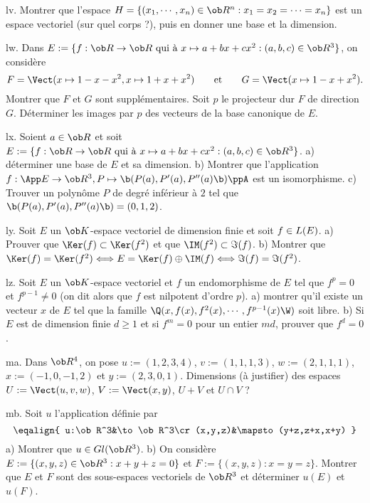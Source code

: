 \exo  [Level=1,Fight=0,Learn=0,Field=\DimensionFinie,Type=\Exercices,Origin=] lv. 
Montrer que l'espace $H=\{(x_1,\cdots,x_n)\in\ob R^n:x_1=x_2=\cdots=x_n\}$ est un espace vectoriel (sur quel corps ?), puis en donner une base et la dimension. 

\exo  [Level=1,Fight=0,Learn=1,Field=\DimensionFinie,Type=\Exercices,Origin=] lw. 
Dans $E:=\{f:\ob R\to\ob R\hbox{ qui à }x\mapsto a+bx+cx^2:(a,b,c)\in\ob R^3\}$, on considère
$$
F=\Vect(x\mapsto 1-x-x^2,x\mapsto 1+x+x^2)\qquad\hbox{et}\qquad G=\Vect(x\mapsto 1-x+x^2).
$$
Montrer que $F$ et $G$ sont supplémentaires. Soit $p$ le projecteur dur $F$ de direction $G$. Déterminer les images par $p$ des vecteurs de la base canonique de $E$. 

\exo  [Level=1,Fight=0,Learn=1,Field=\DimensionFinie,Type=\Exercices,Origin=] lx. 
Soient $a\in\ob R$ et soit $E:=\{f:\ob R\to\ob R\hbox{ qui à }x\mapsto a+bx+cx^2:(a,b,c)\in\ob R^3\}$. \pn
a) déterminer une base de $E$ et sa dimension. \pn
b) Montrer que l'application $f:\App E\to\ob R^3,P\mapsto\b(P(a),P'(a),P''(a)\b)\ppA$ est un isomorphisme. \pn
c) Trouver un polynôme $P$ de degré inférieur à $2$ tel que $\b(P(a),P'(a),P''(a)\b)=(0,1,2)$. 

\exo  [Level=1,Fight=0,Learn=1,Field=\DimensionFinie,Type=\Exercices,Origin=] ly. 
Soit $E$ un $\ob K$-espace vectoriel de dimension finie et soit $f\in\sc L(E)$. \pn
a) Prouver que $\Ker(f)\subset\Ker(f^2)$ et que $\IM(f^2)\subset\Im(f)$. \pn
b) Montrer que $\Ker(f)=\Ker(f^2)\Longleftrightarrow E=\Ker(f)\oplus\IM(f)\Longleftrightarrow \Im(f)=\Im(f^2)$. 

\exo  [Level=1,Fight=2,Learn=2,Field=\DimensionFinie,Type=\Exercices,Origin=] lz. 
Soit $E$ un $\ob K$-espace vectoriel et $f$ un endomorphisme de $E$ tel que $f^p=0$ et $f^{p-1}\neq0$ (on dit alors que $f$ est nilpotent d'ordre $p$). \pn
a) montrer qu'il existe un vecteur $x$ de $E$ tel que la famille $\Q(x,f(x),f^2(x),\cdots,f^{p-1}(x)\W)$ soit libre.  \pn
b) Si $E$ est de dimension finie $d\ge1$ et si $f^m=0$ pour un entier $md$, prouver que $f^d=0$. 

\exo  [Level=1,Fight=0,Learn=1,Field=\DimensionFinie,Type=\Exercices,Origin=] ma. 
Dans $\ob R^4$, on pose $u:=(1,2,3,4)$, $v:=(1,1,1,3)$, $w:=(2,1,1,1)$, $x:=(-1,0,-1,2)$ et $y:=(2,3,0,1)$. 
Dimensions (à justifier) des espaces $U:=\Vect(u,v,w)$, $V:=\Vect(x,y)$, $U+V$ et $U\cap V$ ? 

\exo  [Level=1,Fight=0,Learn=1,Field=\DimensionFinie,Type=\Exercices,Origin=] mb. 
Soit $u$ l'application définie par 
$$
\eqalign{
u:\ob R^3&\to\ob R^3\cr
(x,y,z)&\mapsto (y+z,z+x,x+y)
}
$$
a) Montrer que $u\in\sc Gl(\ob R^3)$. \pn
b) On considère $E:=\{(x,y,z)\in\ob R^3:x+y+z=0\}$ et $F:=\{(x,y,z):x=y=z\}$. 
Montrer que $E$ et $F$ sont des sous-espaces vectoriels de $\ob R^3$ et déterminer $u(E)$ et $u(F)$. 

